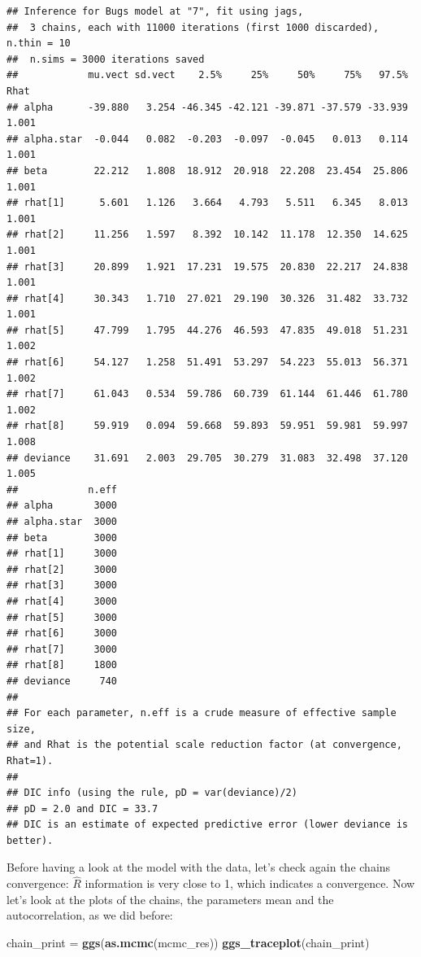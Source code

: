 \documentclass[]{article}
\newenvironment{Shaded}{\begin{snugshade}}{\end{snugshade}}
\newcommand{\KeywordTok}[1]{\textcolor[rgb]{0.13,0.29,0.53}{\textbf{#1}}}
\newcommand{\NormalTok}[1]{#1}
\newcommand{\StringTok}[1]{\textcolor[rgb]{0.31,0.60,0.02}{#1}}
\begin{document}
\begin{verbatim}
## Inference for Bugs model at "7", fit using jags,
##  3 chains, each with 11000 iterations (first 1000 discarded), n.thin = 10
##  n.sims = 3000 iterations saved
##            mu.vect sd.vect    2.5%     25%     50%     75%   97.5%  Rhat
## alpha      -39.880   3.254 -46.345 -42.121 -39.871 -37.579 -33.939 1.001
## alpha.star  -0.044   0.082  -0.203  -0.097  -0.045   0.013   0.114 1.001
## beta        22.212   1.808  18.912  20.918  22.208  23.454  25.806 1.001
## rhat[1]      5.601   1.126   3.664   4.793   5.511   6.345   8.013 1.001
## rhat[2]     11.256   1.597   8.392  10.142  11.178  12.350  14.625 1.001
## rhat[3]     20.899   1.921  17.231  19.575  20.830  22.217  24.838 1.001
## rhat[4]     30.343   1.710  27.021  29.190  30.326  31.482  33.732 1.001
## rhat[5]     47.799   1.795  44.276  46.593  47.835  49.018  51.231 1.002
## rhat[6]     54.127   1.258  51.491  53.297  54.223  55.013  56.371 1.002
## rhat[7]     61.043   0.534  59.786  60.739  61.144  61.446  61.780 1.002
## rhat[8]     59.919   0.094  59.668  59.893  59.951  59.981  59.997 1.008
## deviance    31.691   2.003  29.705  30.279  31.083  32.498  37.120 1.005
##            n.eff
## alpha       3000
## alpha.star  3000
## beta        3000
## rhat[1]     3000
## rhat[2]     3000
## rhat[3]     3000
## rhat[4]     3000
## rhat[5]     3000
## rhat[6]     3000
## rhat[7]     3000
## rhat[8]     1800
## deviance     740
## 
## For each parameter, n.eff is a crude measure of effective sample size,
## and Rhat is the potential scale reduction factor (at convergence, Rhat=1).
## 
## DIC info (using the rule, pD = var(deviance)/2)
## pD = 2.0 and DIC = 33.7
## DIC is an estimate of expected predictive error (lower deviance is better).
\end{verbatim}

Before having a look at the model with the data, let's check again the
chains convergence: \(\hat{R}\) information is very close to 1, which
indicates a convergence. Now let's look at the plots of the chains, the
parameters mean and the autocorrelation, as we did before:

\begin{Shaded}
\begin{Highlighting}[]
\NormalTok{chain_print =}\StringTok{ }\KeywordTok{ggs}\NormalTok{(}\KeywordTok{as.mcmc}\NormalTok{(mcmc_res))}
\KeywordTok{ggs_traceplot}\NormalTok{(chain_print)}
\end{Highlighting}
\end{Shaded}
\end{document}
